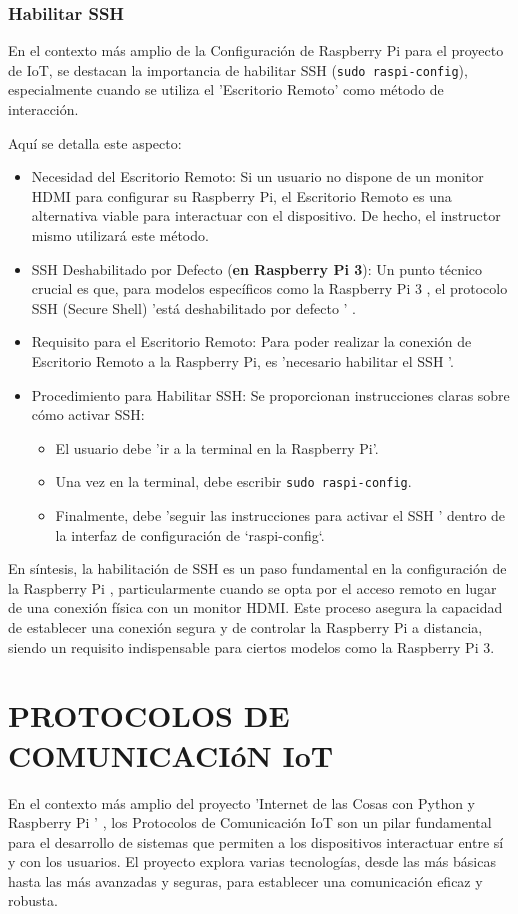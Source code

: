 \documentclass{report}
\begin{document}
\subsection{Habilitar SSH}
En el contexto más amplio de la  Configuración de Raspberry Pi  para el proyecto de IoT, se destacan la 
importancia de  habilitar SSH (\verb|sudo raspi-config|), especialmente cuando se utiliza el 'Escritorio Remoto' como método de interacción.

Aquí se detalla este aspecto:
\begin{itemize}
    \item Necesidad del Escritorio Remoto:  Si un usuario no dispone de un monitor HDMI para configurar su Raspberry Pi, el  Escritorio Remoto  es 
    una alternativa viable para interactuar con el dispositivo. De hecho, el instructor mismo utilizará este método.
    \item SSH Deshabilitado por Defecto (\textbf{en Raspberry Pi 3}):  Un punto técnico crucial es que, para modelos específicos como la  Raspberry Pi 3 , el 
    protocolo SSH (Secure Shell)   'está deshabilitado por defecto ' .
    \item Requisito para el Escritorio Remoto:  Para poder realizar la conexión de Escritorio Remoto a la Raspberry Pi, es 'necesario habilitar el SSH '.
    \item Procedimiento para Habilitar SSH:  Se proporcionan instrucciones claras sobre cómo activar SSH:
    \begin{itemize}
        \item El usuario debe 'ir a la terminal en la Raspberry Pi'.
        \item Una vez en la terminal, debe escribir \verb|sudo raspi-config|.
        \item Finalmente, debe   'seguir las instrucciones para activar el SSH '  dentro de la interfaz de configuración de `raspi-config`.
    \end{itemize}
\end{itemize}
En síntesis, la habilitación de SSH es un paso fundamental en la  configuración de la Raspberry Pi , particularmente cuando se opta por el acceso remoto en 
lugar de una conexión física con un monitor HDMI. Este proceso asegura la capacidad de establecer una conexión segura y de controlar la Raspberry 
Pi a distancia, siendo un requisito indispensable para ciertos modelos como la Raspberry Pi 3.

\chapter{PROTOCOLOS DE COMUNICACIóN IoT}
En el contexto más amplio del proyecto   'Internet de las Cosas con Python y Raspberry Pi ' , los  Protocolos de Comunicación IoT  son un pilar fundamental 
para el desarrollo de sistemas que permiten a los dispositivos interactuar entre sí y con los usuarios. El proyecto explora varias tecnologías, desde 
las más básicas hasta las más avanzadas y seguras, para establecer una comunicación eficaz y robusta.
\end{document}
